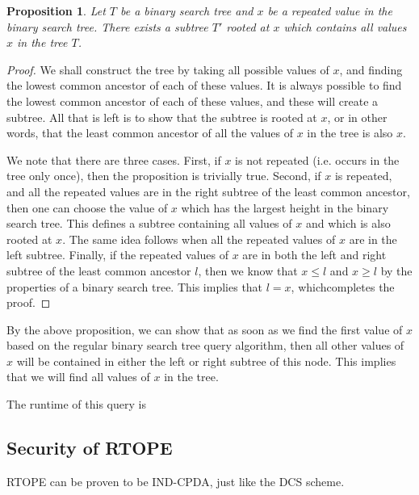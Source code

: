 \documentclass[12pt]{article}
\newtheorem{proposition}[theorem]{Proposition}
\begin{document}
  \begin{proposition}
    Let $T$ be a binary search tree and $x$ be a repeated value in the binary search tree. There exists a subtree $T'$ rooted at $x$ which contains all values $x$ in the tree $T$.
  \end{proposition}
  \begin{proof}
    We shall construct the tree by taking all possible values of $x$, and finding the lowest common ancestor of each of these values. It is always possible to find the lowest common ancestor of each of these values, and these will create a subtree. All that is left is to show that the subtree is rooted at $x$, or in other words, that the least common ancestor of all the values of $x$ in the tree is also $x$.

    We note that there are three cases. First, if $x$ is not repeated (i.e. occurs in the tree only once), then the proposition is trivially true. Second, if $x$ is repeated, and all the repeated values are in the right subtree of the least common ancestor, then one can choose the value of $x$ which has the largest height in the binary search tree. This defines a subtree containing all values of $x$ and which is also rooted at $x$. The same idea follows when all the repeated values of $x$ are in the left subtree. Finally, if the repeated values of $x$ are in both the left and right subtree of the least common ancestor $l$, then we know that $x \leq l$ and $x \geq l$ by the properties of a binary search tree. This implies that $l = x$, whichcompletes the proof.
  \end{proof}

  By the above proposition, we can show that as soon as we find the first value of $x$ based on the regular binary search tree query algorithm, then all other values of $x$ will be contained in either the left or right subtree of this node. This implies that we will find all values of $x$ in the tree.

  The runtime of this query is

  \subsection{Security of RTOPE}

  RTOPE can be proven to be IND-CPDA, just like the DCS scheme.
\end{document}

